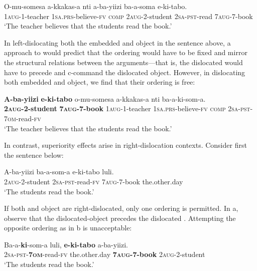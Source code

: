 \documentclass[output=paper,newtxmath,modfonts,nonflat,hidelinks]{langsci/langscibook}
\begin{document}
\ea\label{ex:ranero:38}
\gll O-mu-somesa    a-kkakas-a                 nti        a-ba-yiizi           ba-a-soma     e-ki-tabo.\\
1\textsc{aug}{}-1-teacher \textsc{1sa.prs}{}-believe-\textsc{fv} \textsc{comp} \textsc{2aug-2-}student \textsc{2sa-pst}{}-read 7\textsc{aug}{}-7-book\\
\glt ‘The teacher believes that the students read the book.’
\z

In left-dislocating both the embedded  and object in the sentence above, a  approach to  would predict that the ordering would have to be fixed and mirror the structural relations between the arguments—that is, the dislocated  would have to precede and c-command the dislocated object. However, in dislocating both embedded  and object, we find that their ordering is free:

\ea\label{ex:ranero:39}
\gll \textbf{A-ba-yiizi}           \textbf{{\textbar}{\textbar}} \textbf{e-ki-tabo}        o-mu-somesa     a-kkakas-a            nti  ba-a-ki-som-a.\\
\textbf{2\textsc{aug}}\textbf{{}-2-student}  {}  \textbf{7}\textbf{\textsc{aug}}\textbf{{}-7-book} 1\textsc{aug}{}-1-teacher \textsc{1sa.prs}{}-believe-\textsc{fv} \textsc{comp} \textsc{2sa-pst-7om}{}-read\textsc{{}-fv}\\
\glt \textsc{‘}The teacher believes that the students read the book.’
\z

{In contrast, superiority effects arise in right-dislocation contexts. Consider first the sentence below:}

\ea\label{ex:ranero:40}
\gll A-ba-yiizi       ba-a-som-a  e-ki-tabo   luli.\\
2\textsc{aug}{}-2-student \textsc{2sa-pst}{}-read-\textsc{fv} 7\textsc{aug}{}-7-book the.other.day\\
\glt ‘The students read the book.’
\z

If both  and object are right-dislocated, only one ordering is permitted. In a, observe that the dislocated-object precedes the dislocated . Attempting the opposite ordering as in b is unacceptable:

\ea\label{ex:ranero:41}
\ea\label{ex:ranero:41a}
\gll Ba-a-\textbf{ki}{}-som-a      luli,        \textbf{e-ki-tabo} a-ba-yiizi.\\
\textsc{2sa-pst-}\textbf{\textsc{7om}}{}-read-\textsc{fv} the.other.day \textbf{\textsc{7aug-7}}\textbf{{}-book} \textsc{2aug}{}-2-student\\
\glt ‘The students read the book.’
\end{document}
